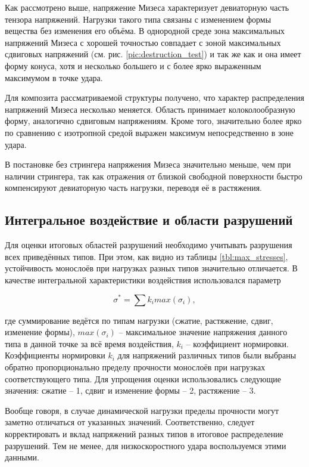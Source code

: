 Как рассмотрено выше, напряжение Мизеса характеризует девиаторную часть тензора напряжений. Нагрузки такого типа связаны с изменением формы вещества без изменения его объёма. В однородной среде зона максимальных напряжений Мизеса с хорошей точностью совпадает с зоной максимальных сдвиговых напряжений (см. рис. \ref{pic:destruction_test}) и так же как и она имеет форму конуса, хотя и несколько большего и с более ярко выраженным максимумом в точке удара.

Для композита рассматриваемой структуры получено, что характер распределения напряжений Мизеса несколько меняется. Область принимает колоколообразную форму, аналогично сдвиговым напряжениям. Кроме того, значительно более ярко по сравнению с изотропной средой выражен максимум непосредственно в зоне удара.

В постановке без стрингера напряжения Мизеса значительно меньше, чем при наличии стрингера, так как отражения от близкой свободной поверхности быстро компенсируют девиаторную часть нагрузки, переводя её в растяжения.


\clearpage
\newpage

\subsection{Интегральное воздействие и области разрушений}

Для оценки итоговых областей разрушений необходимо учитывать разрушения всех приведённых типов. При этом, как видно из таблицы \ref{tbl:max_stresses}, устойчивость монослоёв при нагрузках разных типов значительно отличается. В качестве интегральной характеристики воздействия использовался параметр

\begin{equation}
\sigma^* = \sum{k_i max(\sigma_i)},
\end{equation}

где суммирование ведётся по типам нагрузки (сжатие, растяжение, сдвиг, изменение формы), $max(\sigma_i)$ -- максимальное значение напряжения данного типа в данной точке за всё время воздействия, $k_i$ -- коэффициент нормировки. Коэффициенты нормировки $k_i$ для напряжений различных типов были выбраны обратно пропорционально пределу прочности монослоёв при нагрузках соответствующего типа. Для упрощения оценки использовались следующие значения: сжатие -- 1, сдвиг и изменение формы -- 2, растяжение -- 3.

Вообще говоря, в случае динамической нагрузки пределы прочности могут заметно отличаться от указанных значений. Соответственно, следует корректировать и вклад напряжений разных типов в итоговое распределение разрушений. Тем не менее, для низкоскоростного удара воспользуемся этими данными.

